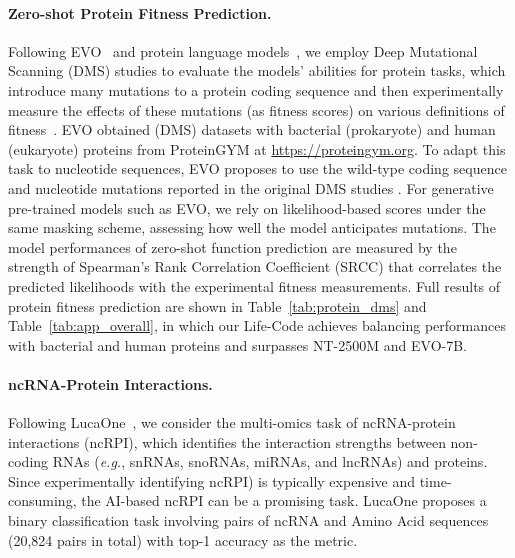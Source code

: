 \paragraph{Zero-shot Protein Fitness Prediction.}
Following EVO~\citep{nguyen2024evo} and protein language models~\citep{lin2023esm}, we employ Deep Mutational Scanning (DMS) studies to evaluate the models' abilities for protein tasks, which introduce many mutations to a protein coding sequence and then experimentally measure the effects of these mutations (as fitness scores) on various definitions of fitness~\citep{icml2022Tranception}. EVO obtained (DMS) datasets with bacterial (prokaryote) and human (eukaryote) proteins from ProteinGYM at \url{https://proteingym.org}.
To adapt this task to nucleotide sequences, EVO proposes to use the wild-type coding sequence and nucleotide mutations reported in the original DMS studies \citep{icml2022Tranception, altae2021widespread}. For generative pre-trained models such as EVO, we rely on likelihood-based scores under the same masking scheme, assessing how well the model anticipates mutations.
The model performances of zero-shot function prediction are measured by the strength of Spearman's Rank Correlation Coefficient (SRCC) that correlates the predicted likelihoods with the experimental fitness measurements.
Full results of protein fitness prediction are shown in Table~\ref{tab:protein_dms} and Table~\ref{tab:app_overall}, in which our Life-Code achieves balancing performances with bacterial and human proteins and surpasses NT-2500M and EVO-7B.


\vspace{-0.5em}
\paragraph{ncRNA-Protein Interactions.}
Following LucaOne~\citep{he2024lucaone}, we consider the multi-omics task of ncRNA-protein interactions (ncRPI), which identifies the interaction strengths between non-coding RNAs (\textit{e.g.}, snRNAs, snoRNAs, miRNAs, and lncRNAs) and proteins. Since experimentally identifying ncRPI) is typically expensive and time-consuming, the AI-based ncRPI can be a promising task. LucaOne proposes a binary classification task involving pairs of ncRNA and Amino Acid sequences (20,824 pairs in total) with top-1 accuracy as the metric.

\vspace{-0.5em}
